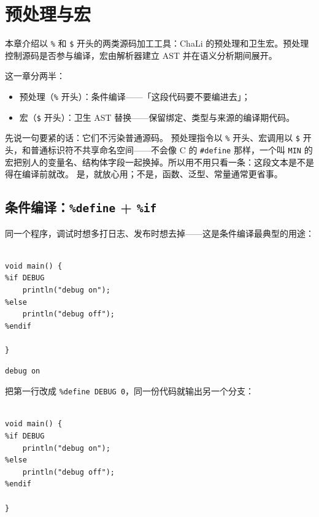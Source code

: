 \chapter{预处理与宏}
\label{ch:19}

本章介绍以 \texttt{\%} 和 \texttt{\$} 开头的两类源码加工工具：ChaLi 的预处理和卫生宏。预处理控制源码是否参与编译，宏由解析器建立 AST 并在语义分析期间展开。

这一章分两半：

\begin{itemize}

\item 预处理（\texttt{\%} 开头）：条件编译——「这段代码要不要编进去」；

\item 宏（\texttt{\$} 开头）：卫生 AST 替换——保留绑定、类型与来源的编译期代码。

\end{itemize}

先说一句要紧的话：它们不污染普通源码。 预处理指令以 \texttt{\%} 开头、宏调用以 \texttt{\$} 开头，和普通标识符不共享命名空间——不会像 C 的 \texttt{\#define} 那样，一个叫 \texttt{MIN} 的宏把别人的变量名、结构体字段一起换掉。所以用不用只看一条：这段文本是不是得在编译前就改。 是，就放心用；不是，函数、泛型、常量通常更省事。

\section{条件编译：\texttt{\%define} + \texttt{\%if}}

同一个程序，调试时想多打日志、发布时想去掉——这是条件编译最典型的用途：

\par
\medskip
\begin{lstlisting}[style=chali]
%define DEBUG 1

void main() {
%if DEBUG
    println("debug on");
%else
    println("debug off");
%endif

}
\end{lstlisting}
\par
\medskip

\par
\medskip
\begin{lstlisting}[style=out]
debug on
\end{lstlisting}
\par
\medskip

把第一行改成 \texttt{\%define DEBUG 0}，同一份代码就输出另一个分支：

\par
\medskip
\begin{lstlisting}[style=chali]
%define DEBUG 0

void main() {
%if DEBUG
    println("debug on");
%else
    println("debug off");
%endif

}
\end{lstlisting}
\par
\medskip

